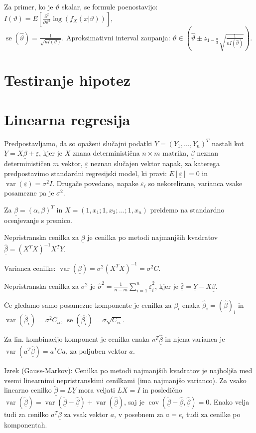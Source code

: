 \documentclass[11pt,a4paper]{amsart}
\theoremstyle{definition} %
\theoremstyle{plain} %
\newcommand{\Y}{\underline{Y}}
\newcommand{\ubeta}{\ensuremath{\underline{\beta}}}
\newcommand{\ueps}{\ensuremath{\underline{\varepsilon}}}
\DeclareMathOperator{\cov}{cov}
\DeclareMathOperator{\var}{var}
\DeclareMathOperator{\se}{se}
\begin{document}
Za primer, ko je $\vartheta$ skalar, se formule poenostavijo:
$I(\vartheta) = E[\frac{\partial^2}{\partial\vartheta^2}
\log(f_X(x|\vartheta))]$, \\
$\se(\hat{\vartheta}) = \frac{1}{\sqrt{n I(\vartheta)}}$.
Aproksimativni interval zaupanja: $\vartheta \in \left( \hat{\vartheta} \pm z_{1-\frac{\alpha}{2}}
\sqrt{\frac{1}{nI(\hat{\vartheta})}}\right)$.

\section*{Testiranje hipotez}

\section*{Linearna regresija}
Predpostavljamo, da so opaženi slučajni podatki $\Y = (Y_1, \dots, Y_n)^T$ nastali kot
$\Y = X \ubeta + \ueps$, kjer je $X$ znana deterministična $n \times m$ matrika, $\ubeta$
neznan determinističen $m$ vektor, $\ueps$ neznan slučajen vektor napak, za katerega
predpostavimo standardni regresijski model, ki pravi: $E[\ueps] = 0$ in
$\var(\ueps) = \sigma^2 I$.  Drugače povedano, napake $\varepsilon_i$ so
nekorelirane, varianca vsake posamezne pa je $\sigma^2$.

Za $\ubeta = (\alpha, \beta)^T$ in $X = (1, x_1; 1, x_2; \dots; 1, x_n)$
preidemo na standardno ocenjevanje s premico.

Nepristranska cenilka za $\ubeta$ je cenilka po metodi najmanjših kvadratov
$\hat{\ubeta} = (X^TX)^{-1}X^TY$.

Varianca cenilke: $\var(\ubeta) = \sigma^2(X^TX)^{-1} = \sigma^2C$.

Nepristranska cenilka za $\sigma^2$ je $\hat{\sigma}^2 = \frac{1}{n-m}
\sum_{i=1}^n \hat{\ueps}_i^2$, kjer je $\hat{\ueps} = \Y - X\ubeta$.

Če gledamo samo posamezne komponente je cenilka za $\beta_i$ enaka
$\hat{\beta}_i = (\hat{\ubeta})_i$ in $\var(\hat{\beta}_i) = \sigma^2C_{ii}$,
$\se(\hat{\beta_i}) = \sigma \sqrt{C_{ii}}$.

Za lin. kombinacijo komponent je cenilka enaka $a^T\hat{\ubeta}$ in njena
varianca je $\var(a^T\hat{\ubeta}) = a^T C a$, za poljuben vektor $a$.

Izrek (Gauss-Markov): Cenilka po metodi najmanjših kvadratov je najboljša med
vsemi linearnimi nepristranskimi cenilkami (ima najmanjšo varianco). Za vsako
linearno cenilko $\tilde{\ubeta} = L\Y$ mora veljati $LX = I$ in posledično
$\var(\tilde{\ubeta}) = \var(\tilde{\ubeta} - \hat{\ubeta}) +
\var(\hat{\ubeta})$, saj je $\cov(\tilde{\ubeta} - \hat{\ubeta}, \hat{\ubeta}) =
0$. Enako velja tudi za cenilko $a^T\hat{\ubeta}$ za vsak vektor $a$, v posebnem
za $a = e_i$ tudi za cenilke po komponentah.
\end{document}

